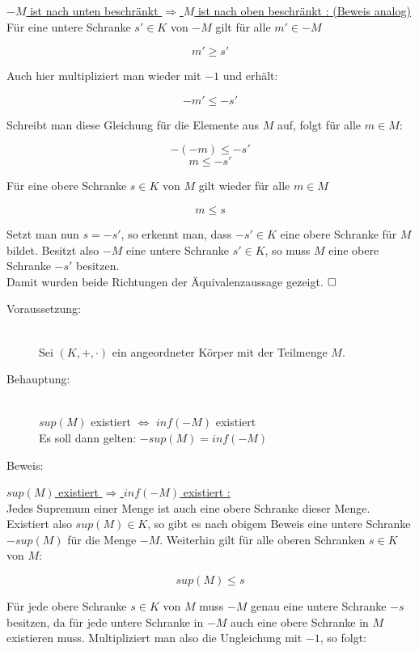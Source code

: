 \documentclass[11pt, a4paper]{article}
\begin{document}
		\underline{$-M$ ist nach unten beschränkt $\Rightarrow$ $M$ ist nach oben beschränkt : (Beweis analog)} \\

		Für eine untere Schranke $s' \in K$ von $-M$ gilt für alle $m' \in -M$

		\[ m' \geq s' \]

		Auch hier multipliziert man wieder mit $-1$ und erhält:

		\[ -m' \leq -s' \]

		Schreibt man diese Gleichung für die Elemente aus $M$ auf, folgt für alle $m \in M$:

		\[ -(-m) \leq -s' \]
		\[ m \leq -s' \]

		Für eine obere Schranke $s \in K$ von $M$ gilt wieder für alle $m \in M$

		\[ m \leq s \]

		Setzt man nun $s=-s'$, so erkennt man, dass $-s' \in K$ eine obere Schranke für $M$ bildet. Besitzt also $-M$ eine untere Schranke $s' \in K$, so muss $M$ eine obere Schranke $-s'$ besitzen. \\

		Damit wurden beide Richtungen der Äquivalenzaussage gezeigt. $\hfill\Box$ \\



		\begin{description}
			\item[Voraussetzung:] \hfill \\
				Sei $(K,+,\cdot)$ ein angeordneter Körper mit der Teilmenge $M$. \hfill 
			\item[Behauptung:] \hfill \\
				$sup(M)$ existiert $\Leftrightarrow$ $inf(-M)$ existiert \hfill \\
				Es soll dann gelten: $-sup(M) = inf(-M)$ \hfill 
			\item[Beweis:] 
		\end{description}

		\underline{$sup(M)$ existiert $\Rightarrow$ $inf(-M)$ existiert :} \\

		Jedes Supremum einer Menge ist auch eine obere Schranke dieser Menge. Existiert also $sup(M) \in K$, so gibt es nach obigem Beweis eine untere Schranke $-sup(M)$ für die Menge $-M$.
		Weiterhin gilt für alle oberen Schranken $s \in K$ von $M$:

		\[ sup(M) \leq s \]

		Für jede obere Schranke $s \in K$ von $M$ muss $-M$ genau eine untere Schranke $-s$ besitzen, da für jede untere Schranke in $-M$ auch eine obere Schranke in $M$ existieren muss.
		Multipliziert man also die Ungleichung mit $-1$, so folgt:
\end{document}
